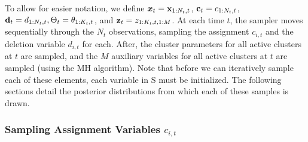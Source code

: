 \documentclass[twocolumn, final]{svjour3}
\begin{document}
To allow for easier notation, we define $\boldsymbol{x}_{t} = \bold{x}_{1:N_{t},t}$, $\bold{c}_{t} = c_{1:N_{t},t}$, $\bold{d}_{t} = d_{1:N_{t},t}, \Theta_{t} = \theta_{1:K_{t}, t}$, and $\bold{z}_{t} = z_{1:K_{t},t,1:M}$.
At each time $t$, the sampler moves sequentially through the $N_{t}$ observations, sampling the assignment $c_{i,t}$ and the deletion variable $d_{i,t}$ for each. After, the cluster parameters for all active clusters at $t$ are sampled, and the $M$ auxiliary variables for all active clusters at $t$ are sampled (using the MH algorithm). Note that before we can iteratively sample each of these elements, each variable in S must be initialized. The following sections detail the posterior distributions from which each of these samples is drawn.





\subsubsection{Sampling Assignment Variables $c_{i,t}$}
\label{sec:sample_assignments}
\end{document}
